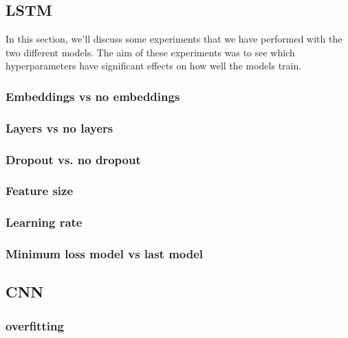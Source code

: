 \subsection{LSTM}  %
In this section, we'll discuss some experiments that we have performed with the two different models. The aim of these experiments was to see which hyperparameters have significant effects on how well the models train.

\subsubsection{Embeddings vs no embeddings} %

\subsubsection{Layers vs no layers}

\subsubsection{Dropout vs. no dropout} %


\subsubsection{Feature size} %

\subsubsection{Learning rate} %

\subsubsection{Minimum loss model vs last model} %



\subsection{CNN} %
\subsubsection{overfitting} %